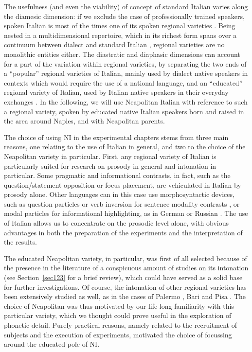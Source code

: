 The usefulness (and even the viability) of concept of standard Italian varies along the diamesic dimension: if we exclude the case of professionally trained speakers, spoken Italian is most of the times one of its spoken regional varieties \citep{bruni1992italiano}. Being nested in a multidimensional repertoire, which in its richest form spans over a continuum between dialect and standard Italian \citep{sabatini1985italiano}, regional varieties are no monolithic entities either. The diastratic and diaphasic dimensions can account for a part of the variation within regional varieties, by separating the two ends of a ``popular'' regional varieties of Italian, mainly used by dialect native speakers in contexts which would require the use of a national language, and an ``educated'' regional variety of Italian, used by Italian native speakers in their everyday exchanges \citep{sobrero1992italiano}. In the following, we will use Neapolitan Italian with reference to such a regional variety, spoken by educated native Italian speakers born and raised in the area around Naples, and with Neapolitan parents.

The choice of using NI in the experimental chapters stems from three main reasons, one relating to the use of Italian in general, and two to the choice of the Neapolitan variety in particular. First, any regional variety of Italian is particularly suited for research on prosody in general and intonation in particular. Some pragmatic and informational contrasts, in fact, such as the question/statement opposition or focus placement, are vehiculated in Italian by prosody alone. Other languages can in this case use morphosyntactic devices, such as question particles or verb inversion for sentence modality contrasts \citep{wals-2011-116}, or modal particles for informational highlighting, as in German or Russian \citep{arndt1960modal}. The use of Italian allows us to concentrate on the prosodic level alone, with obvious advantages in both the preparation of the experiments and the interpretation of the results.

The educated Neapolitan variety, in particular, was first of all selected because of the presence in the literature of a conspicuous amount of studies on its intonation (see Section~\ref{sec123} for a brief review), which could have served as a solid base for further investigations. Of course, the intonation of other regional varieties has been extensively studied as well, as in the cases of Palermo \citep{grice1995intonation}, Bari \citep{savino1997ruolo} and Pisa \citep{gilifivela2004phonetics}. The choice of Neapolitan was thus motivated by our life-long familiarity with this particular variety, which we thought could prove useful in the exploration of phonetic detail. Purely practical reasons, namely related to the recruitment of subjects and the execution of experiments, motivated the choice of focussing around the educated pole of NI.

